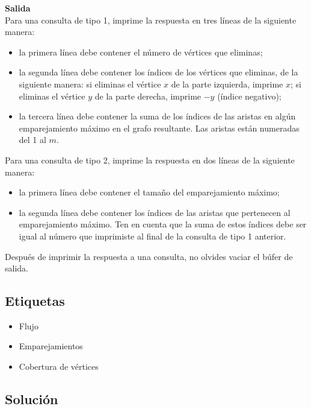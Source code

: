 \documentclass{article}
\begin{document}
\textbf{Salida}\\

Para una consulta de tipo 1, imprime la respuesta en tres líneas de la siguiente manera:

\begin{itemize}
    \item la primera línea debe contener el número de vértices que eliminas;
    \item la segunda línea debe contener los índices de los vértices que eliminas, de la siguiente manera: si eliminas el vértice $x$ de la parte izquierda, imprime $x$; si eliminas el vértice $y$ de la parte derecha, imprime $-y$ (índice negativo);
    \item la tercera línea debe contener la suma de los índices de las aristas en algún emparejamiento máximo en el grafo resultante. Las aristas están numeradas del 1 al $m$.
\end{itemize}

Para una consulta de tipo 2, imprime la respuesta en dos líneas de la siguiente manera:

\begin{itemize}
    \item la primera línea debe contener el tamaño del emparejamiento máximo;
    \item la segunda línea debe contener los índices de las aristas que pertenecen al emparejamiento máximo. Ten en cuenta que la suma de estos índices debe ser igual al número que imprimiste al final de la consulta de tipo 1 anterior.
\end{itemize}

Después de imprimir la respuesta a una consulta, no olvides vaciar el búfer de salida.

\subsection{Etiquetas}

\begin{itemize}
    \item Flujo
    \item Emparejamientos
    \item Cobertura de vértices
\end{itemize}

\subsection{Solución}
\end{document}
